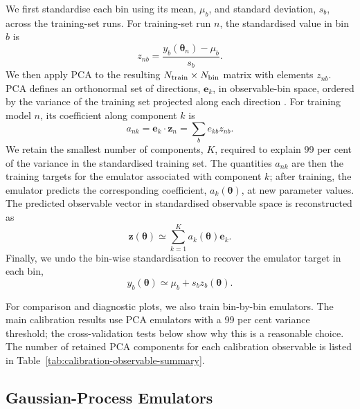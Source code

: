 \documentclass[twocolumn, apj, numberedappendix, iop]{openjournal}
\begin{document}
We first standardise each bin using its mean, $\mu_b$, and
standard deviation, $s_b$, across the training-set runs. For training-set run $n$, the standardised value in
bin $b$ is
\begin{equation}
  z_{nb} =
  \frac{y_b(\boldsymbol{\theta}_n)-\mu_b}{s_b}.
\end{equation}
We then apply PCA to the resulting $N_{\rm train}\times N_{\rm bin}$ matrix
with elements $z_{nb}$.
PCA defines an orthonormal set
of directions, $\mathbf{e}_k$, in observable-bin space, ordered by the variance
of the training set projected along each direction \citep[e.g.][]{2016RSPTA.37450202J}.
For training model $n$, its coefficient along component $k$ is
\begin{equation}
  a_{nk} = \mathbf{e}_k\cdot\mathbf{z}_n
         = \sum_b e_{kb} z_{nb}.
\end{equation}
We retain the smallest number of components, $K$, required to explain 99 per
cent of the variance in the standardised training set.
The quantities $a_{nk}$ are then the training targets for the emulator associated with component $k$; after training, the emulator predicts the corresponding coefficient, $a_k(\boldsymbol{\theta})$, at new parameter values.
The predicted observable vector in standardised observable space is reconstructed as
\begin{equation}
  \mathbf{z}(\boldsymbol{\theta}) \simeq
  \sum_{k=1}^{K} a_k(\boldsymbol{\theta}) \mathbf{e}_k.
\end{equation}
Finally, we undo the bin-wise standardisation to recover the emulator target in each bin,
\begin{equation}
  y_b(\boldsymbol{\theta}) \simeq
  \mu_b + s_b z_b(\boldsymbol{\theta}).
\end{equation}

For comparison and diagnostic plots, we also train bin-by-bin emulators.
The main calibration results use PCA emulators with a 99 per cent variance threshold; the cross-validation tests below show why this is a reasonable choice. The number of retained PCA components for each calibration observable is listed in Table~\ref{tab:calibration-observable-summary}.

\subsection{Gaussian-Process Emulators}
\label{sec:gp-regression}
\end{document}
